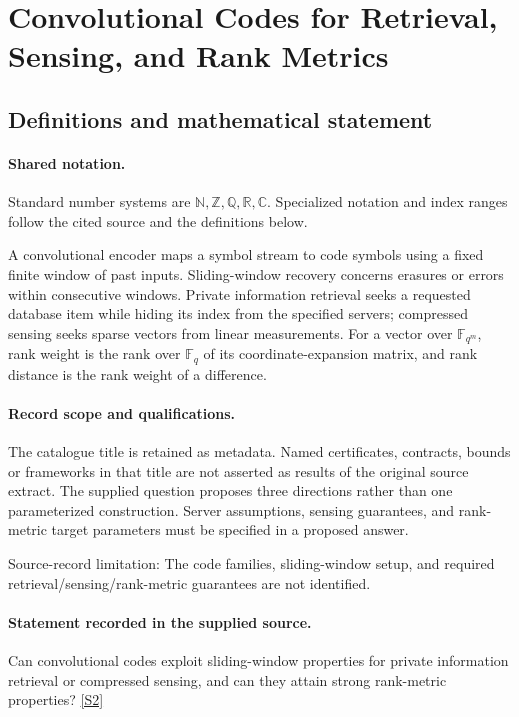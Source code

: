 \documentclass[11pt]{article}
\newcommand{\sref}[2]{\hyperlink{source:#1:#2}{[S#2]}}
\begin{document}
\section{Convolutional Codes for Retrieval, Sensing, and Rank Metrics}\label{statement}

\subsection{Definitions and mathematical statement}

\paragraph{Shared notation.}Standard number systems are $\mathbb N,\mathbb Z,\mathbb Q,\mathbb R,\mathbb C$. Specialized notation and index ranges follow the cited source and the definitions below.


A convolutional encoder maps a symbol stream to code symbols using a fixed finite window of past inputs. Sliding-window recovery concerns erasures or errors within consecutive windows. Private information retrieval seeks a requested database item while hiding its index from the specified servers; compressed sensing seeks sparse vectors from linear measurements. For a vector over $\mathbb F_{q^m}$, rank weight is the rank over $\mathbb F_q$ of its coordinate-expansion matrix, and rank distance is the rank weight of a difference.
\paragraph{Record scope and qualifications.}
The catalogue title is retained as metadata. Named certificates, contracts, bounds or frameworks in that title are not asserted as results of the original source extract.
The supplied question proposes three directions rather than one parameterized construction. Server assumptions, sensing guarantees, and rank-metric target parameters must be specified in a proposed answer.

Source-record limitation: The code families, sliding-window setup, and required retrieval/sensing/rank-metric guarantees are not identified.
\paragraph{Statement recorded in the supplied source.}
Can convolutional codes exploit sliding-window properties for private information retrieval or compressed sensing, and can they attain strong rank-metric properties? \sref{statement}{2}
\end{document}
